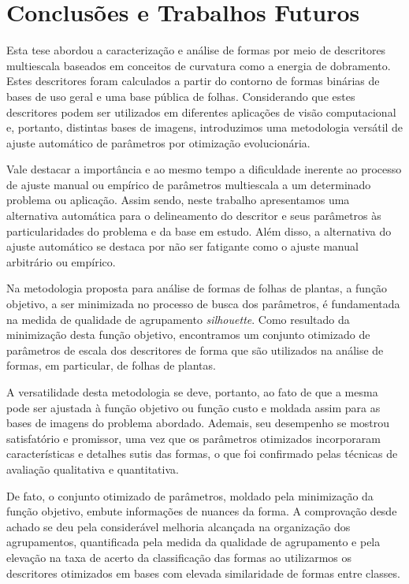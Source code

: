 
\chapter{Conclusões e Trabalhos Futuros \label{chap:ch5}}

Esta tese abordou a caracterização e análise de formas por meio de descritores multiescala baseados em conceitos de curvatura como a energia de dobramento. Estes descritores foram calculados a partir do contorno de formas binárias de bases de uso geral e uma base pública de folhas. Considerando que estes descritores podem ser utilizados em diferentes aplicações de visão computacional e,  portanto, distintas bases de imagens, introduzimos uma metodologia versátil de ajuste automático de parâmetros por otimização evolucionária. 

Vale destacar a importância e ao mesmo tempo a dificuldade inerente ao processo de ajuste manual ou empírico de parâmetros multiescala a um determinado problema ou aplicação. Assim sendo, neste trabalho apresentamos uma alternativa automática para o delineamento do descritor e seus parâmetros às particularidades do problema e da base em estudo.  
Além disso, a alternativa do ajuste automático se destaca por não ser fatigante como o ajuste manual arbitrário ou empírico.

Na metodologia proposta para análise de formas de folhas de plantas, a função objetivo, a ser minimizada no processo de busca dos parâmetros, é fundamentada na medida de qualidade de agrupamento \textit{silhouette}. Como resultado da minimização desta função objetivo, encontramos um conjunto otimizado de parâmetros de escala dos descritores de forma que são utilizados na análise de formas, em particular, de folhas de plantas.  

A versatilidade desta metodologia se deve, portanto, ao fato de que a mesma pode ser ajustada à função  objetivo ou função custo e moldada assim para as bases de imagens do problema abordado. Ademais, seu desempenho se mostrou satisfatório e promissor, uma vez que os parâmetros otimizados incorporaram características e detalhes sutis das formas, o que foi confirmado pelas técnicas de avaliação qualitativa e quantitativa. 

De fato, o conjunto otimizado de parâmetros, moldado pela minimização da função objetivo,  embute informações de nuances da forma. A comprovação desde achado se deu pela considerável melhoria alcançada na organização dos agrupamentos, quantificada pela medida da qualidade de agrupamento e pela elevação na taxa de acerto da classificação das formas ao utilizarmos os descritores otimizados em bases com elevada similaridade de formas entre classes. 

